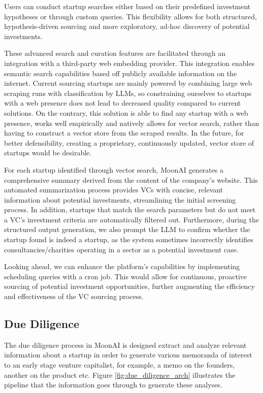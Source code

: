 \documentclass[a4paper, oneside]{discothesis}
\begin{document}
Users can conduct startup searches either based on their predefined investment hypotheses or through custom queries. This flexibility allows for both structured, hypothesis-driven sourcing and more exploratory, ad-hoc discovery of potential investments.

These advanced search and curation features are facilitated through an integration with a third-party web embedding provider. This integration enables semantic search capabilities based off publicly available information on the internet. Current sourcing startups are mainly powered by combining large web scraping runs with classification by LLMs, so constraining ourselves to startups with a web presence does not lead to decreased quality compared to current solutions. On the contrary, this solution is able to find any startup with a web presence, works well empirically and natively allows for vector search, rather than having to construct a vector store from the scraped results. In the future, for better defensibility, creating a proprietary, continuously updated, vector store of startups would be desirable. 

For each startup identified through vector search, MoonAI generates a comprehensive summary derived from the content of the company's website. This automated summarization process provides VCs with concise, relevant information about potential investments, streamlining the initial screening process. In addition, startups that match the search parameters but do not meet a VC's investment criteria are automatically filtered out. Furthermore, during the structured output generation, we also prompt the LLM to confirm whether the startup found is indeed a startup, as the system sometimes incorrectly identifies consultancies/charities operating in a sector as a potential investment case. 

Looking ahead, we can enhance the platform's capabilities by implementing scheduling queries with a cron job. This would allow for continuous, proactive sourcing of potential investment opportunities, further augmenting the efficiency and effectiveness of the VC sourcing process.

\subsection{Due Diligence}

The due diligence process in MoonAI is designed extract and analyze relevant information about a startup in order to generate various memoranda of interest to an early stage venture capitalist, for example, a memo on the founders, another on the product etc. Figure \ref{fig:due_diligence_arch} illustrates the pipeline that the information goes through to generate these analyses.
\end{document}
